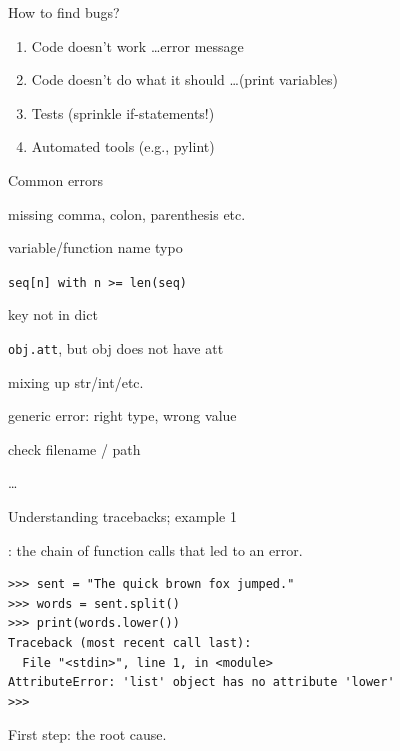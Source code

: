 \documentclass[aspectratio=169,usenames,dvipsnames]{beamer}
\begin{document}
\begin{frame}{How to find bugs?}
	\begin{enumerate}
		\item Code doesn't work \dots error message
        \item Code doesn't do what it should \dots (print variables)
		\item Tests (sprinkle if-statements!)
		\item Automated tools (e.g., pylint)
	\end{enumerate}
\end{frame}

\begin{frame}{Common errors}
    \begin{description}[AttributeError]
        \item[SyntaxError] missing comma, colon, parenthesis etc.
        \item[NameError] variable/function name typo
        \item[IndexError] \texttt{seq[n] with n >= len(seq)}
        \item[KeyError] key not in dict
        \item[AttributeError] \texttt{obj.att}, but obj does not have att
        \item[TypeError] mixing up str/int/etc.
        \item[ValueError] generic error: right type, wrong value
        \item[FileNotFoundError] check filename / path
        \item[\dots] \dots
    \end{description}
\end{frame}

\begin{frame}[fragile]{Understanding tracebacks; example 1}
\begin{definition}
    : the chain of function calls that led to an error.
\end{definition}
\begin{lstlisting}
>>> sent = "The quick brown fox jumped."
>>> words = sent.split()
>>> print(words.lower())
Traceback (most recent call last):
  File "<stdin>", line 1, in <module>
AttributeError: 'list' object has no attribute 'lower'
>>>
\end{lstlisting}

First step:  the root cause.
\end{frame}
\end{document}
